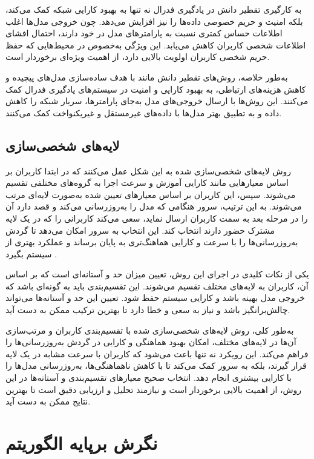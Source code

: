 به کارگیری تقطیر دانش در یادگیری فدرال نه تنها به بهبود کارایی شبکه کمک می‌کند، بلکه امنیت و حریم خصوصی داده‌ها را نیز افزایش می‌دهد. چون خروجی مدل‌ها اغلب اطلاعات حساس کمتری نسبت به پارامترهای مدل در خود دارند، احتمال افشای اطلاعات شخصی کاربران کاهش می‌یابد. این ویژگی به‌خصوص در محیط‌هایی که حفظ حریم شخصی کاربران اولویت بالایی دارد، از اهمیت ویژه‌ای برخوردار است.

به‌طور خلاصه، روش‌های تقطیر دانش مانند
با هدف ساده‌سازی مدل‌های پیچیده و کاهش هزینه‌های ارتباطی، به بهبود کارایی و امنیت در سیستم‌های یادگیری فدرال کمک می‌کنند. این روش‌ها با ارسال خروجی‌های مدل به‌جای پارامترها، سربار شبکه را کاهش داده و به تطبیق بهتر مدل‌ها با داده‌های غیرمستقل و غیریکنواخت کمک می‌کنند.


\subsection{
	لایه‌های شخصی‌سازی%
}
روش لایه‌های شخصی‌سازی شده به این شکل عمل می‌کنند که در ابتدا کاربران بر اساس معیارهایی مانند کارایی آموزش و سرعت اجرا به گروه‌های مختلفی تقسیم می‌شوند. سپس، این کاربران بر اساس معیارهای تعیین شده به‌صورت لایه‌ای مرتب می‌شوند. به این ترتیب، سرور هنگامی که مدل را به‌روزرسانی می‌کند و قصد دارد آن را در مرحله بعد به سمت کاربران ارسال نماید، سعی می‌کند کاربرانی را که در یک لایه مشترک حضور دارند انتخاب کند. این انتخاب به سرور امکان می‌دهد تا گردش به‌روزرسانی‌ها را با سرعت و کارایی هماهنگ‌تری به پایان برساند و عملکرد بهتری از سیستم بگیرد
\cite{chai2020tifl}.

یکی از نکات کلیدی در اجرای این روش، تعیین میزان حد و آستانه‌ای است که بر اساس آن، کاربران به لایه‌های مختلف تقسیم می‌شوند. این تقسیم‌بندی باید به گونه‌ای باشد که خروجی مدل بهینه باشد و کارایی سیستم حفظ شود. تعیین این حد و آستانه‌ها می‌تواند چالش‌برانگیز باشد و نیاز به سعی و خطا دارد تا بهترین ترکیب ممکن به دست آید.

به‌طور کلی، روش لایه‌های شخصی‌سازی شده با تقسیم‌بندی کاربران و مرتب‌سازی آن‌ها در لایه‌های مختلف، امکان بهبود هماهنگی و کارایی در گردش به‌روزرسانی‌ها را فراهم می‌کند. این رویکرد نه تنها باعث می‌شود که کاربران با سرعت مشابه در یک لایه قرار گیرند، بلکه به سرور کمک می‌کند تا با کاهش ناهماهنگی‌ها، به‌روزرسانی مدل‌ها را با کارایی بیشتری انجام دهد. انتخاب صحیح معیارهای تقسیم‌بندی و آستانه‌ها در این روش، از اهمیت بالایی برخوردار است و نیازمند تحلیل و ارزیابی دقیق است تا بهترین نتایج ممکن به دست آید.




\section{نگرش برپایه الگوریتم}
